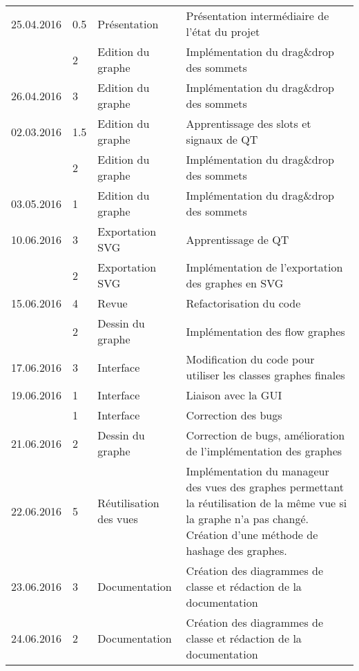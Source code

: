 \documentclass[french]{article}
\begin{document}
\begin{longtable}{p{}|p{}|p{}|p{}}
		\hline
		25.04.2016 & 0.5 & Présentation & Présentation intermédiaire de l'état du projet \\
		           & 2 & Edition du graphe & Implémentation du drag\&drop des sommets \\
		\hline
		26.04.2016 & 3 & Edition du graphe & Implémentation du drag\&drop des sommets \\
		\hline
		02.03.2016 & 1.5 & Edition du graphe & Apprentissage des slots et signaux de QT \\		 
		           & 2 & Edition du graphe & Implémentation du drag\&drop des sommets \\
		\hline
		03.05.2016 & 1 & Edition du graphe & Implémentation du drag\&drop des sommets \\
		\hline
		10.06.2016 & 3 & Exportation SVG & Apprentissage de QT \\
		           & 2 & Exportation SVG & Implémentation de l'exportation des graphes en SVG \\
		\hline
		15.06.2016 & 4 & Revue & Refactorisation du code \\
				   & 2 & Dessin du graphe & Implémentation des flow graphes \\
		\hline
		17.06.2016 & 3 & Interface & Modification du code pour utiliser les classes graphes finales \\
		\hline
		19.06.2016 & 1 & Interface & Liaison avec la GUI \\
				   & 1 & Interface & Correction des bugs \\
		\hline
		21.06.2016 & 2 & Dessin du graphe & Correction de bugs, amélioration de l'implémentation des graphes \\
		\hline
		22.06.2016 & 5 & Réutilisation des vues & Implémentation du manageur des vues des graphes permettant la réutilisation de la même vue si la graphe n'a pas changé. Création d'une méthode de hashage des graphes. \\
		\hline
		23.06.2016 & 3 & Documentation & Création des diagrammes de classe et rédaction de la documentation \\
		\hline
		24.06.2016 & 2 & Documentation & Création des diagrammes de classe et rédaction de la documentation \\
		\hline
	\end{longtable}
	
\end{document}
